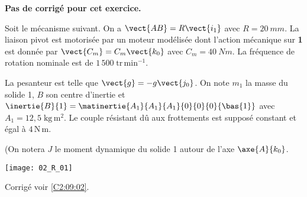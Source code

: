 \normaltrue
\correctionfalse


\setcounter{question}{0}
\ifcorrection
\else
\textbf{Pas de corrigé pour cet exercice.}
\fi

\ifprof
\else
Soit le mécanisme suivant. On a $\vect{AB}=R\vect{i_1}$ avec $R=\SI{20}{mm}$. La liaison pivot est motorisée par un moteur modélisée dont l'action mécanique sur \textbf{1} est donnée par $\vect{C_m}=C_m \vect{k_0}$ avec $C_m = \SI{40}{Nm}$. La fréquence de rotation nominale est de $1\,500\; \text{tr}\,\text{min}^{-1}$. 

 La pesanteur est telle que $\vect{g}=-g\vect{j_0}$.
On note $m_1$ la masse du solide 1, $B$ son centre d'inertie et $\inertie{B}{1}=\matinertie{A_1}{A_1}{A_1}{0}{0}{0}{\bas{1}}$ avec $A_1 = 12,5\; \text{kg}\,\text{m}^2$.
 Le couple résistant dû aux frottements est supposé constant et égal à $4\, \text{N} \, \text{m}$.

(On notera $J$ le moment dynamique du solide 1 autour de l'axe $\axe{A}{k_0}$.

\begin{center}
\texttt{[image: 02\_R\_01]}
\end{center}

\fi


\ifprof
\else
\fi

\ifprof
\else
\fi



\ifprof
\else
\begin{flushright}
\footnotesize{Corrigé  voir \ref{C2:09:02}.}
\end{flushright}%
\fi